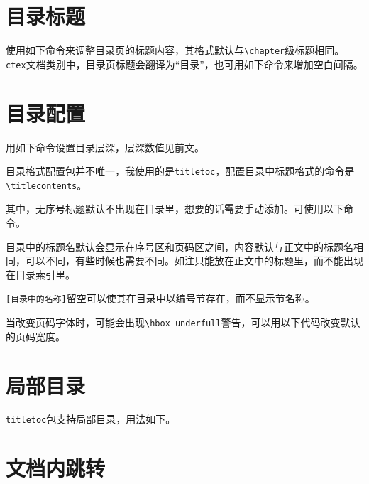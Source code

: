\documentclass[10pt,openany]{book}
\begin{document}
\section{目录标题}

使用如下命令来调整目录页的标题内容，其格式默认与\texttt{\textbackslash{}chapter}级标题相同。\texttt{ctex}文档类别中，目录页标题会翻译为“目录”，也可用如下命令来增加空白间隔。



\section{目录配置}

用如下命令设置目录层深，层深数值见前文。



目录格式配置包并不唯一，我使用的是\texttt{titletoc}，配置目录中标题格式的命令是\texttt{\textbackslash{}titlecontents}。



其中，无序号标题默认不出现在目录里，想要的话需要手动添加。可使用以下命令。



目录中的标题名默认会显示在序号区和页码区之间，内容默认与正文中的标题名相同，可以不同，有些时候也需要不同。如注只能放在正文中的标题里，而不能出现在目录索引里。



\texttt{[目录中的名称]}留空可以使其在目录中以编号节存在，而不显示节名称。

当改变页码字体时，可能会出现\texttt{\textbackslash{}hbox\ underfull}警告，可以用以下代码改变默认的页码宽度。



\section{局部目录}

\texttt{titletoc}包支持局部目录，用法如下。



\section{文档内跳转}
\end{document}
